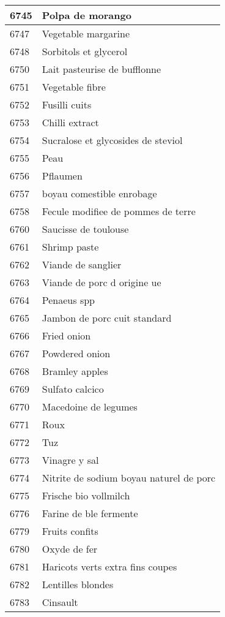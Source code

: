 \begin{longtable}{|l|l|}
6745 & Polpa de morango \\ \hline 
6747 & Vegetable margarine \\ \hline 
6748 & Sorbitols et glycerol \\ \hline 
6750 & Lait pasteurise de bufflonne \\ \hline 
6751 & Vegetable fibre \\ \hline 
6752 & Fusilli cuits \\ \hline 
6753 & Chilli extract \\ \hline 
6754 & Sucralose et glycosides de steviol \\ \hline 
6755 & Peau \\ \hline 
6756 & Pflaumen \\ \hline 
6757 & boyau comestible enrobage \\ \hline 
6758 & Fecule modifiee de pommes de terre \\ \hline 
6760 & Saucisse de toulouse \\ \hline 
6761 & Shrimp paste \\ \hline 
6762 & Viande de sanglier \\ \hline 
6763 & Viande de porc d origine ue \\ \hline 
6764 & Penaeus spp \\ \hline 
6765 & Jambon de porc cuit standard \\ \hline 
6766 & Fried onion \\ \hline 
6767 & Powdered onion \\ \hline 
6768 & Bramley apples \\ \hline 
6769 & Sulfato calcico \\ \hline 
6770 & Macedoine de legumes \\ \hline 
6771 & Roux \\ \hline 
6772 & Tuz \\ \hline 
6773 & Vinagre y sal \\ \hline 
6774 & Nitrite de sodium boyau naturel de porc \\ \hline 
6775 & Frische bio vollmilch \\ \hline 
6776 & Farine de ble fermente \\ \hline 
6779 & Fruits confits \\ \hline 
6780 & Oxyde de fer \\ \hline 
6781 & Haricots verts extra fins coupes \\ \hline 
6782 & Lentilles blondes \\ \hline 
6783 & Cinsault \\ \hline 

\end{longtable}
